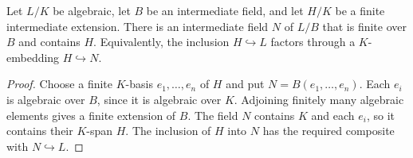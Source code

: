 \begin{lemma}
\label{lem:algebraic-finite-upper-stage}
\leanok
{}
Let $L/K$ be algebraic, let $B$ be an intermediate field, and let
$H/K$ be a finite intermediate extension. There is an intermediate
field $N$ of $L/B$ that is finite over $B$ and contains $H$.
Equivalently, the inclusion $H\hookrightarrow L$ factors through a
$K$-embedding $H\hookrightarrow N$.
\end{lemma}
\begin{proof}
Choose a finite $K$-basis $e_1,\ldots,e_n$ of $H$ and put
$N=B(e_1,\ldots,e_n)$. Each $e_i$ is algebraic over $B$, since it is
algebraic over $K$. Adjoining finitely many algebraic elements gives
a finite extension of $B$. The field $N$ contains $K$ and each $e_i$,
so it contains their $K$-span $H$. The inclusion of $H$ into $N$
has the required composite with $N\hookrightarrow L$.
\end{proof}

